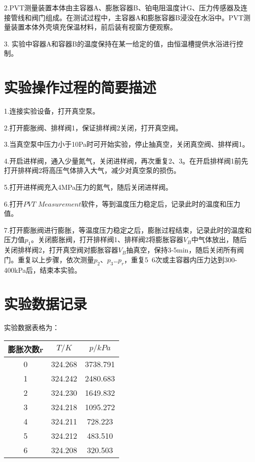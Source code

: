 \documentclass[UTF8,a4paper,10pt]{ctexart}
\begin{document}
    2.PVT测量装置本体由主容器A、膨胀容器B、铂电阻温度计G、压力传感器及连接管线和阀门组成。在测试过程中，主容器A和膨胀容器B浸没在水浴中。PVT测量装置本体外壳填充保温材料，前后装有视窗方便观察。 
    
    3. 实验中容器A和容器B的温度保持在某一给定的值，由恒温槽提供水浴进行控制。
    
    \section{实验操作过程的简要描述} 
    1.连接实验设备，打开真空泵。
    
    2.打开膨胀阀、排样阀1，保证排样阀2关闭，打开真空阀。
    
    3.当真空泵中压力小于10Pa时可开始实验，停止抽真空，关闭真空阀、排样阀1。
    
    4.开启进样阀，通入少量氮气，关闭进样阀，再次重复2、3。在开启排样阀1前先打开排样阀2将高压气体排入大气，减少对真空泵的损伤。
    
    5.打开进样阀充入4MPa压力的氮气，随后关闭进样阀。
    
    6.打开$PVT$ $Measurement$软件，等到温度压力稳定后，记录此时的温度和压力值。
    
    7.打开膨胀阀进行膨胀，等温度压力稳定之后，膨胀过程结束，记录此时的温度和压力值$p_{1}$。关闭膨胀阀，打开排样阀1、排样阀2将膨胀容器$V_{B}$中气体放出，随后关闭排样阀2，打开真空阀对膨胀容器$V_{B}$抽真空，保持3-5min，随后关闭所有阀门。重复以上步骤，依次测量$p_{2}$、$p_{3}$…$p_{r}$，重复5~6次或主容器内压力达到300-400kPa后，结束本实验。
    \section{实验数据记录} 
    实验数据表格为：
    
        \begin{tabular}{|c|c|c|}
    	\hline 
    	膨胀次数r & $T/K$ & $p/kPa$ \\ 
	    \hline
    	0 & 324.268 & 3738.791 \\
	    \hline
    	1 & 324.242 & 2480.683 \\
    	\hline
	    2 & 324.230 & 1649.832 \\
    	\hline
	    3 & 324.218 & 1095.272 \\
    	\hline
    	4 & 324.211 & 728.223 \\
    	\hline
    	5 & 324.212 & 483.510 \\
    	\hline
    	6 & 324.208 & 320.503 \\
    	\hline
        \end{tabular}
\end{document}
